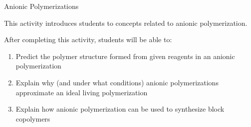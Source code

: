 %
%
%
%

\renewcommand{\figpath}{content/polymchem/livingpolyms/anionic-polyms/figs}
\renewcommand{\labelbase}{anionic-polyms}

\begin{activity}{Anionic Polymerizations}

\begin{instructornotes}
	This activity introduces students to concepts related to anionic polymerization.
	
	After completing this activity, students will be able to:
	\begin{enumerate}
		\item Predict the polymer structure formed from given reagents in an anionic polymerization
		\item Explain why (and under what conditions) anionic polymerizations approximate an ideal living polymerization
		\item Explain how anionic polymerization can be used to synthesize block copolymers
	\end{enumerate}
	

\end{instructornotes}
\end{activity}
